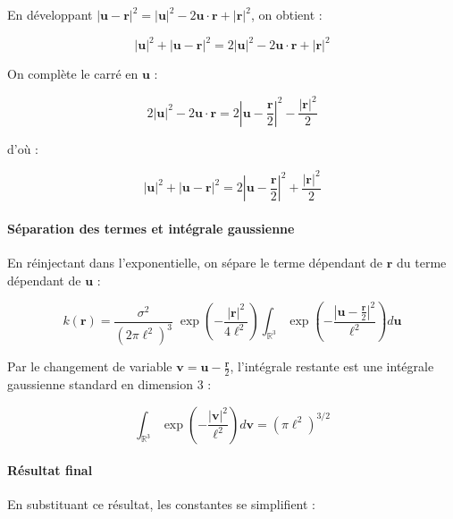 En développant $|\mathbf{u} - \mathbf{r}|^2 = |\mathbf{u}|^2 - 2\mathbf{u}\cdot\mathbf{r} + |\mathbf{r}|^2$, on obtient :

\begin{equation}
|\mathbf{u}|^2 + |\mathbf{u} - \mathbf{r}|^2 = 2|\mathbf{u}|^2 - 2\mathbf{u}\cdot\mathbf{r} + |\mathbf{r}|^2
\end{equation}

On complète le carré en $\mathbf{u}$ :

\begin{equation}
2|\mathbf{u}|^2 - 2\mathbf{u}\cdot\mathbf{r} = 2\left|\mathbf{u} - \frac{\mathbf{r}}{2}\right|^2 - \frac{|\mathbf{r}|^2}{2}
\end{equation}

d'où :

\begin{equation}
|\mathbf{u}|^2 + |\mathbf{u} - \mathbf{r}|^2 = 2\left|\mathbf{u} - \frac{\mathbf{r}}{2}\right|^2 + \frac{|\mathbf{r}|^2}{2}
\end{equation}

\paragraph{Séparation des termes et intégrale gaussienne}

En réinjectant dans l'exponentielle, on sépare le terme dépendant de $\mathbf{r}$ du terme dépendant de $\mathbf{u}$ :

\begin{equation}
k(\mathbf{r}) = \frac{\sigma^2}{(2\pi\ell^2)^{3}}\; \exp\!\left(-\frac{|\mathbf{r}|^2}{4\ell^2}\right) \int_{\mathbb{R}^3} \exp\!\left(-\frac{\left|\mathbf{u} - \frac{\mathbf{r}}{2}\right|^2}{\ell^2}\right) d\mathbf{u}
\end{equation}

Par le changement de variable $\mathbf{v} = \mathbf{u} - \frac{\mathbf{r}}{2}$, l'intégrale restante est une intégrale gaussienne standard en dimension 3 :

\begin{equation}
\int_{\mathbb{R}^3} \exp\!\left(-\frac{|\mathbf{v}|^2}{\ell^2}\right) d\mathbf{v} = (\pi \ell^2)^{3/2}
\end{equation}

\paragraph{Résultat final}

En substituant ce résultat, les constantes se simplifient :

